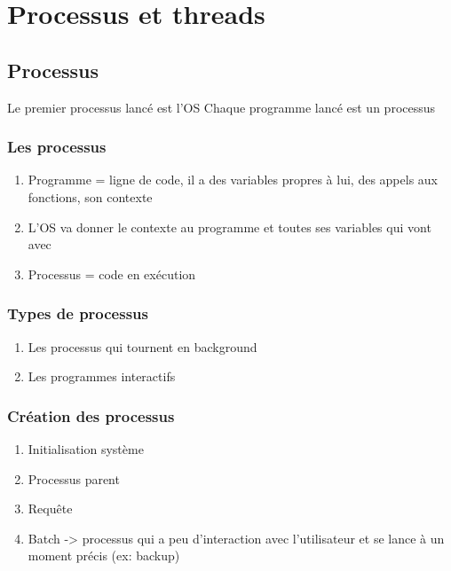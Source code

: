 \chapter{Processus et threads}
\section{Processus}
Le premier processus lancé est l'OS
Chaque programme lancé est un processus

\subsection{Les processus}
\begin{enumerate}
  \item Programme = ligne de code, il a des variables propres à lui, des appels aux fonctions, son contexte
  \item L'OS va donner le contexte au programme et toutes ses variables qui vont avec
  \item Processus = code en exécution
\end{enumerate}

\subsection{Types de processus}
\begin{enumerate}
  \item Les processus qui tournent en background
  \item Les programmes interactifs
\end{enumerate}

\subsection{Création des processus}
\begin{enumerate}
  \item Initialisation système
  \item Processus parent
  \item Requête
  \item Batch -> processus qui a peu d'interaction avec l'utilisateur et se lance à un moment précis (ex: backup)
\end{enumerate}


